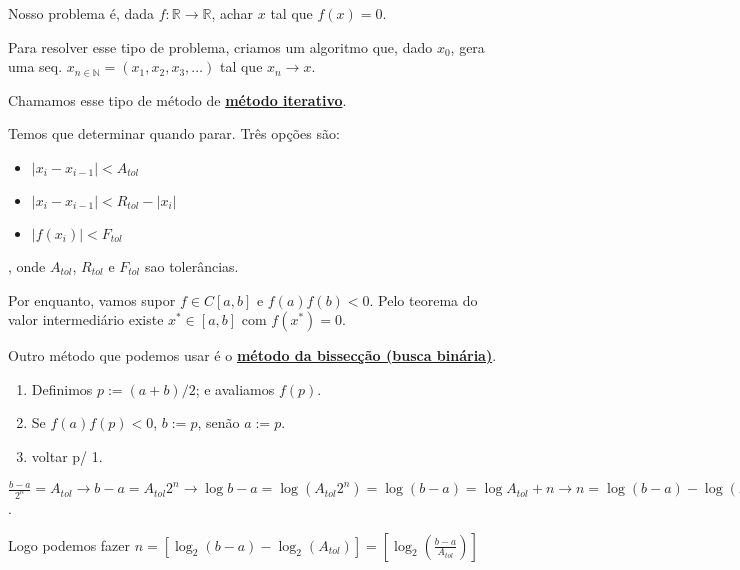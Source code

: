 \documentclass[12pt]{book}
\newcommand{\real}{\mathbb{R}}
\newcommand{\mytitle}[1]{\textbf{\underline{#1}}}
\begin{document}
Nosso problema é, dada $f:\real \to \real$, achar $x$ tal que $f(x)=0$.

Para resolver esse tipo de problema, criamos um algoritmo que, dado $x_0$, gera uma seq. $x_{n\in \mathbb{N}}=(x_1,x_2,x_3,\dots)$ tal que $x_n \to x$.

Chamamos esse tipo de método de \mytitle{método iterativo}.

Temos que determinar quando parar. Três opções são:

\begin{itemize}
\item $|x_i-x_{i-1}|<A_{tol}$
\item $|x_i-x_{i-1}|<R_{tol}-|x_i|$
\item $|f(x_i)|<F_{tol}$
\end{itemize}
, onde $A_{tol}$, $R_{tol}$ e $F_{tol}$ sao tolerâncias.

Por enquanto, vamos supor $f\in C[a,b]$ e $f(a)f(b)<0$. Pelo teorema do valor intermediário existe $x^* \in [a,b]$ com $f(x^*)=0$.

Outro método que podemos usar é o \mytitle{método da bissecção (busca binária)}.
\begin{enumerate}
\item Definimos $p:=(a+b)/2$; e avaliamos $f(p).$
\item Se $f(a)f(p)<0$, $b:=p$, senão $a:=p$.
\item voltar p/ 1.
\end{enumerate}

$\frac{b-a}{2^n}=A_{tol} \rightarrow b-a=A_{tol}2^n \rightarrow \log b-a=\log(A_{tol}2^n)=\log(b-a)=\log A_{tol}+n \rightarrow n=\log(b-a)-\log(A{tol})$.

Logo podemos fazer $n=[\log_2(b-a)-\log_2(A_{tol})]=[\log_2(\frac{b-a}{A_{tol}})]$
\end{document}
